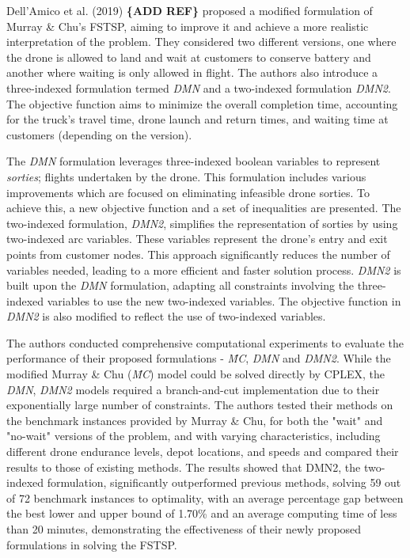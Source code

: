 \documentclass{article}
\begin{document}
	\par
	Dell’Amico et al. (2019) \textbf{\{ADD REF\}} proposed a modified formulation of Murray \& Chu's FSTSP, aiming to improve it and achieve a more realistic interpretation of the problem. They considered two different versions, one where the drone is allowed to land and wait at customers to conserve battery and another where waiting is only allowed in flight. The authors also introduce a three-indexed formulation termed \textit{DMN} and a two-indexed formulation \textit{DMN2}. The objective function aims to minimize the overall completion time, accounting for the truck's travel time, drone launch and return times, and waiting time at customers (depending on the version).
	\par
	The \textit{DMN} formulation leverages three-indexed boolean variables to represent \textit{sorties}; flights undertaken by the drone. This formulation includes various improvements which are focused on eliminating infeasible drone sorties. To achieve this, a new objective function and a set of inequalities are presented.
	The two-indexed formulation, \textit{DMN2}, simplifies the representation of sorties by using two-indexed arc variables. These variables represent the drone's entry and exit points from customer nodes. This approach significantly reduces the number of variables needed, leading to a more efficient and faster solution process. \textit{DMN2} is built upon the \textit{DMN} formulation, adapting all constraints involving the three-indexed variables to use the new two-indexed variables. The objective function in \textit{DMN2} is also modified to reflect the use of two-indexed variables. 
	\par
	The authors conducted comprehensive computational experiments to evaluate the performance of their proposed formulations - \textit{\={MC}}, \textit{DMN} and \textit{DMN2}. While the modified Murray \& Chu (\textit{\={MC}}) model could be solved directly by CPLEX, the \textit{DMN}, \textit{DMN2} models required a branch-and-cut implementation due to their exponentially large number of constraints. The authors tested their methods on the benchmark instances provided by Murray \& Chu, for both the "wait" and "no-wait" versions of the problem, and with varying characteristics, including different drone endurance levels, depot locations, and speeds and compared their results to those of existing methods. The results showed that DMN2, the two-indexed formulation, significantly outperformed previous methods, solving 59 out of 72 benchmark instances to optimality, with an average percentage gap between the best lower and upper bound of 1.70\% and an average computing time of less than 20 minutes, demonstrating the effectiveness of their newly proposed formulations in solving the FSTSP.
\end{document}
